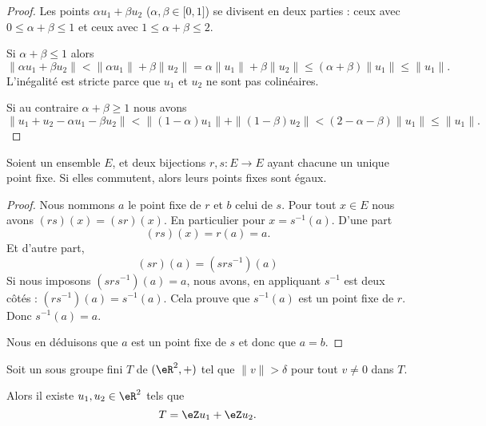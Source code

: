 \begin{proof}
    Les points \( \alpha u_1+\beta u_2\) (\( \alpha,\beta\in \mathopen[ 0 , 1 \mathclose]\)) se divisent en deux parties : ceux avec \( 0\leq\alpha+\beta\leq 1\) et ceux avec \( 1\leq\alpha+\beta\leq 2\).

    Si \( \alpha+\beta\leq 1\) alors
    \begin{equation}
        \| \alpha u_1+\beta u_2 \|<\| \alpha u_1 \|+\beta\| u_2 \|= \alpha\| u_1 \|+\beta\| u_2 \|\leq (\alpha+\beta)\| u_1 \|\leq \| u_1 \|.
    \end{equation}
    L'inégalité est stricte parce que \( u_1\) et \( u_2\) ne sont pas colinéaires.

    Si au contraire \( \alpha+\beta\geq 1\) nous avons
    \begin{equation}
        \| u_1+u_2-\alpha u_1-\beta u_2 \|<\| (1-\alpha)u_1 \|+\| (1-\beta)u_2 \|<(2-\alpha-\beta)\| u_1 \|\leq \| u_1 \|.
    \end{equation}
\end{proof}

\begin{lemma}       \label{LEMooWKTGooQlfuxm}
    Soient un ensemble \( E\), et deux bijections \( r,s\colon E\to E\) ayant chacune un unique point fixe. Si elles commutent, alors leurs points fixes sont égaux. 
\end{lemma}

\begin{proof}
    Nous nommons \( a\) le point fixe de \( r\) et \( b\) celui de \( s\). Pour tout \( x\in E\) nous avons \( (rs)(x)=(sr)(x)\). En particulier pour \( x=s^{-1}(a)\). D'une part
    \begin{equation}
        (rs)(x)=r(a)=a.
    \end{equation}
    Et d'autre part,
    \begin{equation}
        (sr)(a)=(srs^{-1})(a)
    \end{equation}
    Si nous imposons \( (srs^{-1})(a)=a\), nous avons, en appliquant \( s^{-1}\) est deux côtés : \( (rs^{-1})(a)=s^{-1}(a)\). Cela prouve que \( s^{-1}(a)\) est un point fixe de \( r\). Donc \( s^{-1}(a)=a\).

    Nous en déduisons que \( a\) est un point fixe de \( s\) et donc que \( a=b\).
\end{proof}

\begin{lemma}       \label{LEMooDGSJooCiBhZz}
    Soit un sous groupe fini \( T\) de \( (\eR^2,+)\) tel que \( \| v \|>\delta \) pour tout \( v\neq 0\) dans \( T\).

    Alors il existe \( u_1,u_2\in \eR^2\) tels que
    \begin{equation}
        T=\eZ u_1+\eZ u_2.
    \end{equation}
\end{lemma}

